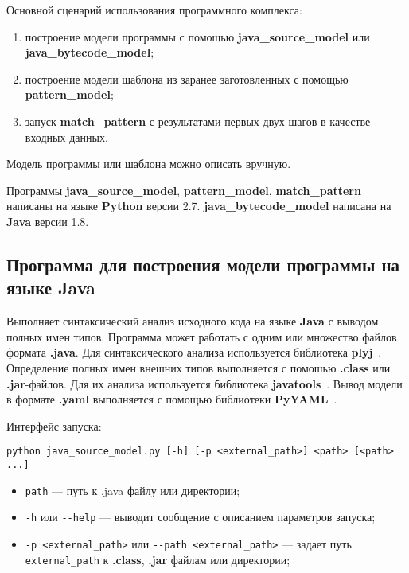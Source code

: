 Основной сценарий использования программного комплекса:
\begin{enumerate}
\item построение модели программы с помощью \textbf{java\_source\_model} или \textbf{java\_bytecode\_model};
\item построение модели шаблона из заранее заготовленных с помощью \textbf{pattern\_model};
\item запуск \textbf{match\_pattern} с результатами первых двух шагов в качестве входных данных.
\end{enumerate}

Модель программы или шаблона можно описать вручную.

Программы \textbf{java\_source\_model}, \textbf{pattern\_model},
\textbf{match\_pattern} написаны на языке \textbf{Python} версии 2.7.
\textbf{java\_bytecode\_model} написана на \textbf{Java} версии 1.8.

\subsection{Программа для построения модели программы на языке Java}

Выполняет синтаксический анализ исходного кода на языке \textbf{Java} с выводом
полных имен типов.
Программа может работать с одним или множество файлов формата \textbf{.java}.
Для синтаксического анализа используется библиотека \textbf{plyj}~\cite{plyj}.
Определение полных имен внешних типов выполняется с помошью \textbf{.class} или
\textbf{.jar}-файлов.
Для их анализа используется библиотека \textbf{javatools}~\cite{javatools}.
Вывод модели в формате \textbf{.yaml} выполняется с помощью библиотеки
\textbf{PyYAML}~\cite{PyYAML}.

Интерфейс запуска:
\begin{verbatim}
python java_source_model.py [-h] [-p <external_path>] <path> [<path> ...]
\end{verbatim}

\begin{itemize}
\item \verb;path; --- путь к .java файлу или директории;
\item \verb;-h; или \verb;--help; --- выводит сообщение с описанием параметров
запуска;
\item \verb;-p <external_path>; или \verb;--path <external_path>; --- задает
путь \verb;external_path; к \textbf{.class}, \textbf{.jar} файлам или директории;
\end{itemize}

